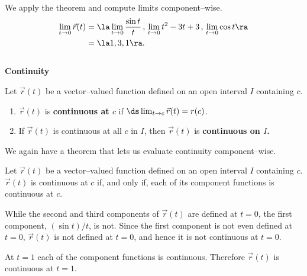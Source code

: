 {We apply the theorem and compute limits component--wise.
\begin{align*}
\lim_{t\to0} \vec r(t) &= \la \lim_{t\to 0}\frac{\sin t}{t}\, , \, \lim_{t\to 0} t^2-3t+3\, , \, \lim_{t\to 0} \cos t\ra \\
			&= \la 1,3,1\ra.
\end{align*}
\baselineskip
}\\

\noindent\textbf{\large Continuity}\\

{Let $\vec r(t)$ be a vector--valued function defined on an open interval $I$ containing $c$.
\begin{enumerate}
	\item $\vec r(t)$ is \textbf{continuous at $c$} if $\ds \lim_{t\to c} \vec r(t) = r(c)$.
	\item	If $\vec r(t)$ is continuous at all $c$ in $I$, then $\vec r(t)$ is \textbf{continuous on $I$.}
\end{enumerate}
}

We again have a theorem that lets us evaluate continuity component--wise.

{Let $\vec r(t)$ be a vector--valued function defined on an open interval $I$ containing $c$. $\vec r(t)$ is continuous at $c$ if, and only if, each of its component functions is continuous at $c$.
}\\

{While the second and third components of $\vec r(t)$ are defined at $t=0$, the first component, $(\sin t)/t$, is not. Since the first component is not even defined at $t=0$, $\vec r(t)$ is not defined at $t=0$, and hence it is not continuous at $t=0$.

At $t=1$ each of the component functions is continuous. Therefore $\vec r(t)$ is continuous at $t=1$.
}\\

